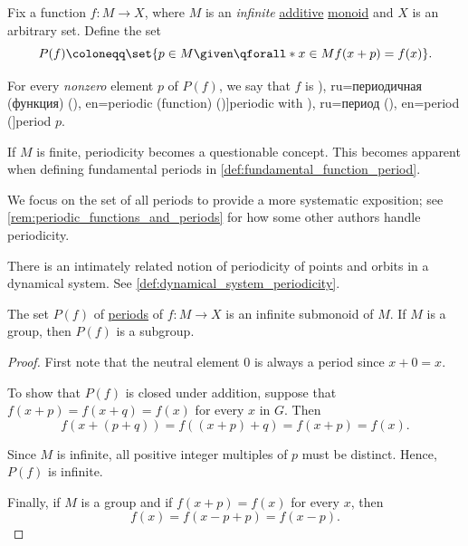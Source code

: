 \begin{definition}\label{def:periodic_function}\mimprovised
  Fix a function \( f: M \to X \), where \( M \) is an \emph{infinite} \hyperref[def:additive_semigroup]{additive} \hyperref[def:monoid]{monoid} and \( X \) is an arbitrary set. Define the set
  \begin{equation*}
    P(f) \coloneqq \set{ p \in M \given \qforall* {x \in M} f(x + p) = f(x) }.
  \end{equation*}

  For every \emph{nonzero} element \( p \) of \( P(f) \), we say that \( f \) is \term[bg=периодична (функция) (\cite[318]{ИлинСадовничиСендов1989АнализТом2}), ru=периодичная (функция) (\cite[371]{Фихтенгольц1968ОсновыАнализаТом2}), en=periodic (function) (\cite[def. 5.1.1]{Tao2022AnalysisII})]{periodic} with \term[bg=период (\cite[318]{ИлинСадовничиСендов1989АнализТом2}), ru=период (\cite[371]{Фихтенгольц1968ОсновыАнализаТом2}), en=period (\cite[def. 8.3]{LidlNiederreiter1997FiniteFields}]{period} \( p \).
\end{definition}
\begin{comments}
  \item If \( M \) is finite, periodicity becomes a questionable concept. This becomes apparent when defining fundamental periods in \cref{def:fundamental_function_period}.

  \item We focus on the set of all periods to provide a more systematic exposition; see \cref{rem:periodic_functions_and_periods} for how some other authors handle periodicity.

  \item There is an intimately related notion of periodicity of points and orbits in a dynamical system. See \cref{def:dynamical_system_periodicity}.
\end{comments}

\begin{proposition}\label{thm:monoid_of_function_periods}
  The set \( P(f) \) of \hyperref[def:periodic_function]{periods} of \( f: M \to X \) is an infinite submonoid of \( M \). If \( M \) is a group, then \( P(f) \) is a subgroup.
\end{proposition}
\begin{proof}
  First note that the neutral element \( 0 \) is always a period since \( x + 0 = x \).

  To show that \( P(f) \) is closed under addition, suppose that \( f(x + p) = f(x + q) = f(x) \) for every \( x \) in \( G \). Then
  \begin{equation*}
    f(x + (p + q)) = f((x + p) + q) = f(x + p) = f(x).
  \end{equation*}

  Since \( M \) is infinite, all positive integer multiples of \( p \) must be distinct. Hence, \( P(f) \) is infinite.

  Finally, if \( M \) is a group and if \( f(x + p) = f(x) \) for every \( x \), then
  \begin{equation*}
    f(x) = f(x - p + p) = f(x - p).
  \end{equation*}
\end{proof}

